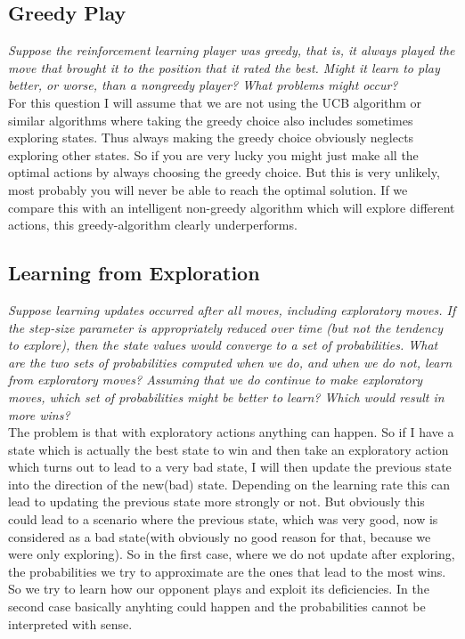 \documentclass[12pt,a4paper]{article}
\begin{document}
\subsection{Greedy Play }
\textit{Suppose the reinforcement learning player was greedy, that is, it always played the move that brought it to the position that it rated the best. Might it learn to play better, or worse, than a nongreedy player? What problems might occur?}\\ 

For this question I will assume that we are not using the UCB algorithm or similar algorithms where taking the greedy choice also includes sometimes exploring states. Thus always making the greedy choice obviously neglects exploring other states. So if you are very lucky you might just make all the optimal actions by always choosing the greedy choice. But this is very unlikely, most probably you will never be able to reach the optimal solution. If we compare this with an intelligent non-greedy algorithm which will explore different actions, this greedy-algorithm clearly underperforms. 

\subsection{Learning from Exploration}
\textit{Suppose learning updates occurred after all moves, including exploratory moves. If the step-size parameter is appropriately reduced over time (but not the tendency to explore), then the state values would converge to a set of probabilities. What are the two sets of probabilities computed when we do, and when we do not, learn from exploratory moves? Assuming that we do continue to make exploratory moves, which set of probabilities might be better to learn? Which would result in more wins?} \\

The problem is that with exploratory actions anything can happen. So if I have a state which is actually the best state to win and then take an exploratory action which turns out to lead to a very bad state, I will then update the previous state into the direction of the new(bad) state. Depending on the learning rate this can lead to updating the previous state more strongly or not. But obviously this could lead to a scenario where the previous state, which was very good, now is considered as a bad state(with obviously no good reason for that, because we were only exploring). So in the first case, where we do not update after exploring, the probabilities we try to approximate are the ones that lead to the most wins. So we try to learn how our opponent plays and exploit its deficiencies. In the second case basically anyhting could happen and the probabilities cannot be interpreted with sense. 
\end{document}
